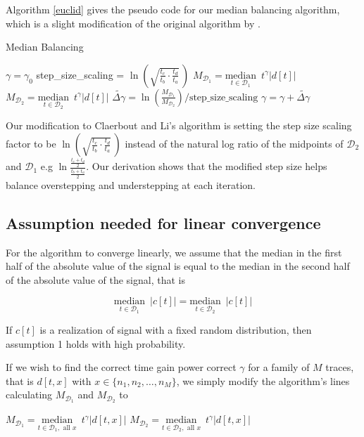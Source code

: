 \documentclass{segabs}
\newcommand{\deltagamma}{{\Delta\gamma}}
\newcommand{\deltagammaguess}{{\widetilde{\deltagamma}}}
\newcommand{\Done}{{\mathcal{D}_1}}
\newcommand{\Dtwo}{{\mathcal{D}_2}}
\newcommand{\undermedian}[2]{\underset{#1}{\text{median}}\,\,\,#2}
\newcommand{\scalefactor}{\ln \left(\sqrt{\frac{t_c}{t_b}\cdot\frac{t_d}{t_a}} \,\right) }
\begin{document}
Algorithm \ref{euclid} gives the pseudo code for our median balancing algorithm, which is a slight modification of the original algorithm by \cite{Claerbout.sep.42.81}. 
\begin{algorithm}
\caption{Median Balancing}\label{euclid}
\begin{algorithmic} 
\STATE $\gamma = \gamma_0$
\STATE step\_size\_scaling = $\scalefactor$
\WHILE{$\deltagammaguess < \mbox{tolerance}$ }
\STATE $M_\Done = \undermedian{t\in \Done}{t^\gamma |d[t]|}$
\STATE $M_\Dtwo = \undermedian{t\in \Dtwo}{t^\gamma |d[t]|}$
\STATE $\deltagammaguess = \ln \left(\frac{M_\Done}{M_\Dtwo} \right) / \text{step\_size\_scaling}$
\STATE $\gamma = \gamma + \deltagammaguess$
\ENDWHILE
\end{algorithmic} 
\end{algorithm}

Our modification to Claerbout and Li's algorithm is setting the step size scaling factor to be $\scalefactor$ instead of the natural log ratio of the midpoints of $\Dtwo$ and $\Done$ e.g $\ln \frac{\frac{t_c+t_d}{2}}{\frac{t_b+t_a}{2}}$.  Our derivation shows that the modified step size  helps balance overstepping and understepping at each iteration.

\subsection{Assumption needed for linear convergence}

For the algorithm to converge linearly, we assume that the median in the first half of the absolute value of the signal is equal to the median in the second half of the absolute value of the signal, that is 

\begin{equation}
 \undermedian{t \in \Done}{ |c[t]| }  = \undermedian{t \in \Dtwo}{|c[t]|}  
\end{equation}


If $c[t]$ is a realization of signal with a fixed random distribution, then assumption 1 holds with high probability.

If we wish to find the correct time gain power correct $\gamma$ for a family of $M$ traces, that is $d[t,x]$ with $x \in \{n_1, n_2, \ldots, n_M\}$, we simply modify the algorithm's lines calculating $M_\Done$ and $M_\Dtwo$ to 


\begin{algorithmic} 
\STATE $M_\Done = \undermedian{t\in \Done, \,\, \mbox{all $x$}}{t^\gamma |d[t,x]|}$
\STATE $M_\Dtwo = \undermedian{t\in \Dtwo, \,\, \mbox{all $x$}}{t^\gamma |d[t,x]|}$
\end{algorithmic} 
\end{document}
